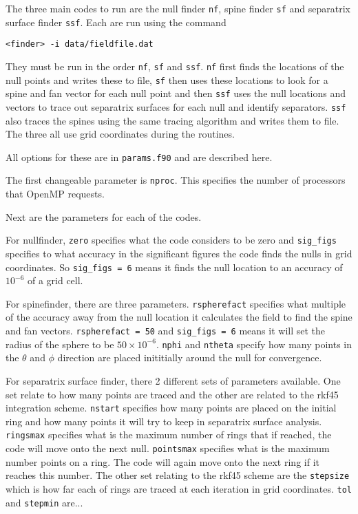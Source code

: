 \documentclass[12pt]{article}
\begin{document}
    The three main codes to run are the null finder \texttt{nf}, spine finder \texttt{sf} and separatrix surface finder \texttt{ssf}. Each are run using the command

    \texttt{<finder> -i data/fieldfile.dat}

    They must be run in the order \texttt{nf}, \texttt{sf} and \texttt{ssf}. \texttt{nf} first finds the locations of the null points and writes these to file, \texttt{sf} then uses these locations to look for a spine and fan vector for each null point and then \texttt{ssf} uses the null locations and vectors to trace out separatrix surfaces for each null and identify separators. \texttt{ssf} also traces the spines using the same tracing algorithm and writes them to file. The three all use grid coordinates during the routines.

    All options for these are in \texttt{params.f90} and are described here.

    The first changeable parameter is \texttt{nproc}. This specifies the number of processors that OpenMP requests.

    Next are the parameters for each of the codes. 
    
    For nullfinder, \texttt{zero} specifies what the code considers to be zero and \texttt{sig\_figs} specifies to what accuracy in the significant figures the code finds the nulls in grid coordinates. So \texttt{sig\_figs = 6} means it finds the null location to an accuracy of \( 10^{-6} \) of a grid cell.

    For spinefinder, there are three parameters. \texttt{rspherefact} specifies what multiple of the accuracy away from the null location it calculates the field to find the spine and fan vectors. \texttt{rspherefact = 50} and \texttt{sig\_figs = 6} means it will set the radius of the sphere to be \( 50 \times 10^{-6} \). \texttt{nphi} and \texttt{ntheta} specify how many points in the \( \theta \) and \( \phi \) direction are placed inititially around the null for convergence.

    For separatrix surface finder, there 2 different sets of parameters available. One set relate to how many points are traced and the other are related to the rkf45 integration scheme. \texttt{nstart} specifies how many points are placed on the initial ring and how many points it will try to keep in separatrix surface analysis. \texttt{ringsmax} specifies what is the maximum number of rings that if reached, the code will move onto the next null. \texttt{pointsmax} specifies what is the maximum number points on a ring. The code will again move onto the next ring if it reaches this number. The other set relating to the rkf45 scheme are the \texttt{stepsize} which is how far each of rings are traced at each iteration in grid coordinates. \texttt{tol} and \texttt{stepmin} are...
  
\end{document}

